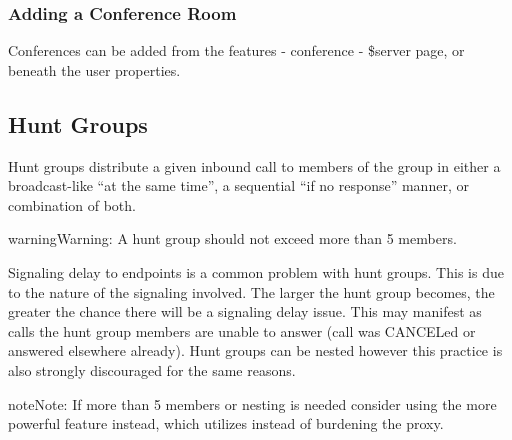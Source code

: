 \documentclass[letterpaper,10pt,english]{sphinxmanual}
\begin{document}
\subsubsection{Adding a Conference Room}
\label{\detokenize{webui:adding-a-conference-room}}
Conferences can be added from the features - conference - \$server page, or beneath the user properties.
\begin{quote}

\end{quote}


\subsection{Hunt Groups}
\label{\detokenize{webui:hunt-groups}}\label{\detokenize{webui:id13}}
Hunt groups distribute a given inbound call to members of the group in either a broadcast-like “at the same time”, a sequential “if no response” manner, or combination of both.
\begin{quote}

\end{quote}

\begin{sphinxadmonition}{warning}{Warning:}
A hunt group should not exceed more than 5 members.
\end{sphinxadmonition}

Signaling delay to endpoints is a common problem with hunt groups. This is due to the nature of the signaling involved.
The larger the hunt group becomes, the greater the chance there will be a signaling delay issue.
This may manifest as calls the hunt group members are unable to answer (call was CANCELed or answered elsewhere already).
Hunt groups can be nested however this practice is also strongly discouraged for the same reasons.

\begin{sphinxadmonition}{note}{Note:}
If more than 5 members or nesting is needed consider using the more powerful {\hyperref[\detokenize{webui:call-queue}]{}} feature instead,
which utilizes  instead of burdening the proxy.
\end{sphinxadmonition}
\end{document}
